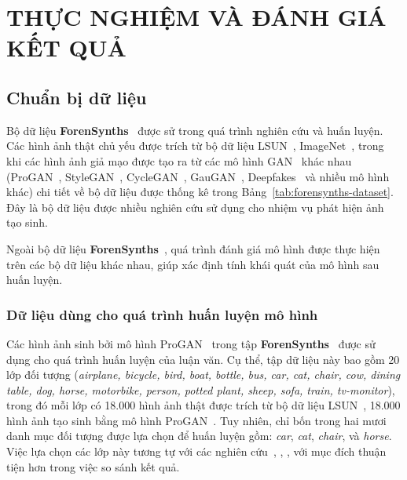 \chapter{THỰC NGHIỆM VÀ ĐÁNH GIÁ KẾT QUẢ}
\label{Chapter4}
\section{Chuẩn bị dữ liệu}
Bộ dữ liệu \textbf{ForenSynths}~\cite{Wang2019CNNGeneratedIA} được sử trong quá trình nghiên cứu và huấn luyện. Các hình ảnh thật chủ yếu được trích từ bộ dữ liệu LSUN~\cite{Yu2015ConstructionOA}, ImageNet~\cite{5206848}, trong khi các hình ảnh giả mạo được tạo ra từ các mô hình GAN~\cite{Goodfellow2014GenerativeAN} khác nhau (ProGAN~\cite{karras2018progressive}, StyleGAN~\cite{karras2019style},  CycleGAN~\cite{zhu2017unpaired}, GauGAN~\cite{park2019SPADE}, Deepfakes~\cite{CaliforniaDeepfakes} và nhiều mô hình khác) chi tiết về bộ dữ liệu được thống kê trong Bảng~\ref{tab:forensynths-dataset}. Đây là bộ dữ liệu được nhiều nghiên cứu sử dụng cho nhiệm vụ phát hiện ảnh tạo sinh.

Ngoài bộ dữ liệu \textbf{ForenSynths}~\cite{Wang2019CNNGeneratedIA}, quá trình đánh giá mô hình được thực hiện trên các bộ dữ liệu khác nhau, giúp xác định tính khái quát của mô hình sau huấn luyện.

\subsection{Dữ liệu dùng cho quá trình huấn luyện mô hình}
Các hình ảnh sinh bởi mô hình ProGAN~\cite{karras2018progressive} trong tập \textbf{ForenSynths}~\cite{Wang2019CNNGeneratedIA} được sử dụng cho quá trình huấn luyện của luận văn. 
%
Cụ thể, tập dữ liệu này bao gồm 20 lớp đối tượng (\textit{airplane, bicycle, bird, boat, bottle, bus, car, cat, chair, cow, dining table, dog, horse, motorbike, person, potted plant, sheep, sofa, train, tv-monitor}), trong đó mỗi lớp có 18.000 hình ảnh thật được trích từ bộ dữ liệu LSUN~\cite{Yu2015LSUNCO}, 18.000 hình ảnh tạo sinh bằng mô hình ProGAN~\cite{karras2018progressive}.
%
Tuy nhiên, chỉ bốn trong hai mươi danh mục đối tượng được lựa chọn để huấn luyện gồm: \textit{car}, \textit{cat}, \textit{chair}, và \textit{horse}. Việc lựa chọn các lớp này tương tự với các nghiên cứu~\cite{Tan2023RethinkingTU}, \cite{Jeong2022FrePGANRD}, \cite{Jeong2021BiHPFBH}, với mục đích thuận tiện hơn trong việc so sánh kết quả.
%

